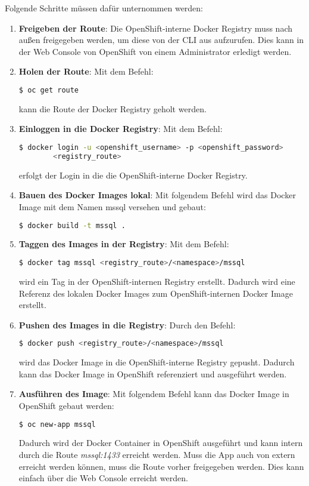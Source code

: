 Folgende Schritte müssen dafür unternommen werden:
\begin{enumerate}
	\item \textbf{Freigeben der Route}: Die OpenShift-interne Docker Registry muss nach außen freigegeben werden, um diese von der CLI aus aufzurufen. Dies kann in der Web Console von OpenShift von einem Administrator erledigt werden.
	\item \textbf{Holen der Route}: Mit dem Befehl:
\begin{lstlisting}[language=bash]
	$ oc get route
\end{lstlisting}
	kann die Route der Docker Registry geholt werden.
	\item \textbf{Einloggen in die Docker Registry}: Mit dem Befehl:
\begin{lstlisting}[language=bash]
	$ docker login -u <openshift_username> -p <openshift_password> 
		<registry_route>
\end{lstlisting}
	erfolgt der Login in die die OpenShift-interne Docker Registry.
	\item \textbf{Bauen des Docker Images lokal}: Mit folgendem Befehl wird das Docker Image mit dem Namen mssql versehen und gebaut:
\begin{lstlisting}[language=bash]
	$ docker build -t mssql .
\end{lstlisting}
	\item \textbf{Taggen des Images in der Registry}: Mit dem Befehl:
\begin{lstlisting}[language=bash]
	$ docker tag mssql <registry_route>/<namespace>/mssql
\end{lstlisting}
	wird ein Tag in der OpenShift-internen Registry erstellt. Dadurch wird eine Referenz des lokalen Docker Images zum OpenShift-internen Docker Image erstellt.
	\item \textbf{Pushen des Images in die Registry}: Durch den Befehl:
\begin{lstlisting}[language=bash]
	$ docker push <registry_route>/<namespace>/mssql
\end{lstlisting}
	wird das Docker Image in die OpenShift-interne Registry gepusht.
	Dadurch kann das Docker Image in OpenShift referenziert und ausgeführt werden.
	\item \textbf{Ausführen des Image}: Mit folgendem Befehl kann das Docker Image in OpenShift gebaut werden:
\begin{lstlisting}[language=bash]
	$ oc new-app mssql
\end{lstlisting}
	Dadurch wird der Docker Container in OpenShift ausgeführt und kann intern durch die Route \textit{mssql:1433} erreicht werden. Muss die App auch von extern erreicht werden können, muss die Route vorher freigegeben werden. Dies kann einfach über die Web Console erreicht werden.
\end{enumerate}

